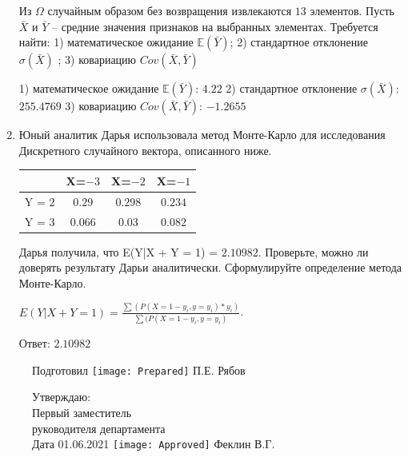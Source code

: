 \documentclass[a4paper,14pt]{article}
\begin{document}
\begin{enumerate}
Из $\Omega$ случайным образом без возвращения извлекаются $13$ элементов. 
Пусть $\bar X$ и $\bar Y$ – средние значения признаков на выбранных элементах. 
Требуется найти: 1) математическое ожидание $\mathbb{E}(\bar Y)$; 2) стандартное отклонение $\sigma(\bar X)$ ; 
3) ковариацию $Cov(\bar X, \bar Y)$




1) математическое ожидание $\mathbb{E}(\bar Y)$: $4.22$ 
2) стандартное отклонение $\sigma(\bar X)$: $255.4769$
3) ковариацию $Cov(\bar X, \bar Y)$: $-1.2655$


\item

    
    	Юный аналитик Дарья использовала метод Монте-Карло для исследования Дискретного случайного вектора, описанного ниже.

        \begin{tabular}{|c|c|c|c|}
	\hline
	& X=$-3$ & X=$-2$ & X=$-1$ \\
	\hline
	Y = $2$ & $0.29$ & $0.298$  &  $0.234$ \\
	\hline
	Y = $3$ & $0.066$ & $0.03$ & $0.082$  \\
	\hline
\end{tabular}

    	Дарья получила, что E(Y|X + Y = 1) = $2.10982$.
    	Проверьте, можно ли доверять результату Дарьи аналитически. Сформулируйте определение метода Монте-Карло.
    


    
        $E(Y|X+Y=1) = \frac{\sum(P(X=1 - y_i, y=y_i) * y_i)}{\sum(P(X=1 - y_i, y=y_i)}$.

        Ответ: $2.10982$
    

\end{enumerate}

\begin{figure}[H]
	Подготовил
	\hfill
	\texttt{[image: Prepared]}
	П.Е. Рябов
\end{figure}


\begin{figure}[H]
	Утверждаю:\\
	Первый заместитель\\
	руководителя департамента\\
	Дата 01.06.2021
	\hfill
	\texttt{[image: Approved]}
	Феклин В.Г.
\end{figure}
\end{document}
